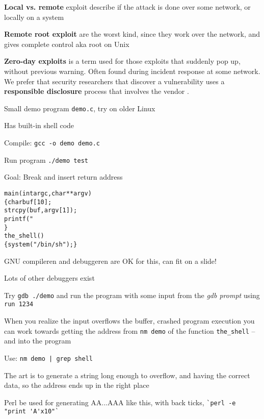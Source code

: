 \documentclass[Screen16to9,17pt]{foils}
\begin{document}
\begin{list1}
\item {\bfseries Local vs. remote} exploit describe if the attack is done over some network, or locally on a system
\item {\bfseries Remote root exploit}
are the worst kind, since they work over the network, and gives complete control aka root on Unix
\item {\bfseries Zero-day exploits} is a term used for those exploits that suddenly pop up, without previous warning. Often found during incident response at some network. We prefer that security researchers that discover a vulnerability uses a {\bf responsible disclosure} process that involves the vendor .
\end{list1}






\begin{list2}
\item Small demo program \verb+demo.c+, try on older Linux
\item Has built-in shell code
\item Compile:
\verb+gcc -o demo demo.c+
\item Run program
\verb+./demo test+
\item Goal: Break and insert return address
\end{list2}

\begin{alltt}\small
main(int argc, char **argv)
\{      char buf[10];
        strcpy(buf, argv[1]);
        printf("%s\textbackslash{}n",buf);
\}
the_shell()
\{  system("/bin/sh");  \}
\end{alltt}



\begin{list1}
\item GNU compileren and debuggeren are OK for this, can fit on a slide!
\item Lots of other debuggers exist
\item Try \verb+gdb ./demo+ and run the program with some input from the \emph{gdb prompt}
using \verb+run 1234+
\item When you realize the input overflows the buffer, crashed program execution you can work towards getting the address from \verb+nm demo+ of the function \verb+the_shell+
   -- and into the program
\item Use: \verb+nm demo | grep shell+
\item The art is to generate a string long enough to overflow, and having the correct data, so the address ends up in the right place
\item Perl be used for generating AA...AAA like this, with back ticks, \verb+`perl -e "print 'A'x10"`+
\end{list1}
\end{document}
